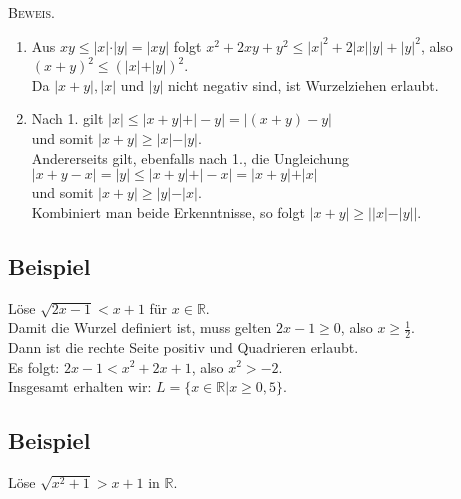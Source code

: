 	\textsc{Beweis.}
	\begin{enumerate}
	\item Aus $xy \leq \vert x\vert \cdot \vert y\vert = \vert xy \vert$ folgt
	$x^2+2xy+y^2 \leq {\vert x \vert}^2+2\vert x \vert \vert y \vert + {\vert y \vert}^2$,
	also $(x+y)^2 \leq (\vert x \vert + \vert y \vert)^2$.\\
	Da $\vert x+y\vert, \vert x \vert$ und $\vert y \vert$ nicht negativ sind, ist Wurzelziehen erlaubt.
	
	\item Nach 1. gilt $\vert x \vert \leq \vert x+y\vert + \vert -y \vert = \vert (x+y)-y \vert$\\
	und somit $\vert x+y \vert \geq \vert x \vert - \vert y \vert$.\\
	Andererseits gilt, ebenfalls nach 1., die Ungleichung\\ 
	$\vert x+y-x\vert = \vert y \vert \leq \vert x+y \vert + \vert -x \vert = \vert x+y \vert + \vert x \vert$\\
	und somit $\vert x+y \vert \geq \vert y \vert - \vert x \vert$.\\ \newline
	Kombiniert man beide Erkenntnisse, so folgt 
	$\vert x+y \vert \geq \big\vert \vert x \vert - \vert y \vert\big \vert$.
	\end{enumerate}
	
	
\subsection{Beispiel}

	Löse $\sqrt{2x-1} < x+1$ für $x\in \mathbb{R}$.\\ \newline
	Damit die Wurzel definiert ist, muss gelten $2x-1\geq 0$, also $x\geq \frac{1}{2}$.\\
	Dann ist die rechte Seite positiv und Quadrieren erlaubt.\\ \newline
	Es folgt: $2x-1<x^2+2x+1$, also $x^2>-2$.\\ \newline
	Insgesamt erhalten wir: $L=\{ x\in \mathbb{R}| x\geq 0,5\}$.
	
	
\subsection{Beispiel}

	Löse $\sqrt{x^2+1}>x+1$ in $\mathbb{R}$.\\
	
